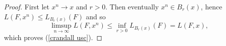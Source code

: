 \documentclass[reqno,11pt]{amsart}
\newcommand*\dif{\mathop{}\!\mathrm{d}}
\theoremstyle{definition}
\numberwithin{equation}{section}
\begin{document}
\begin{proof}
First let $x^n \to x$ and $r > 0$. Then eventually $x^n \in B_r(x)$, hence $L(F, x^n) \leq L_{B_r(x)}(F)$ and so
$$\limsup_{n \to \infty} L(F, x^n) \leq \inf_{r > 0} L_{B_r(x)}(F) = L(F, x),$$
which proves (\ref{crandall usc}).
	


\end{proof}
\end{document}
